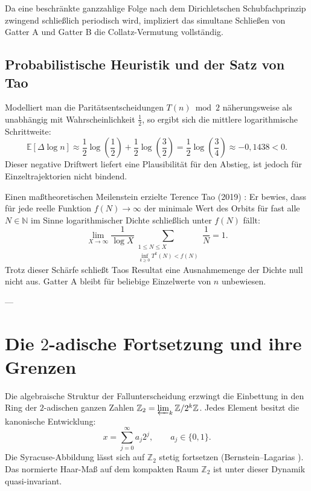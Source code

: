 \documentclass[11pt,reqno]{amsart}
\theoremstyle{definition}
\theoremstyle{remark}
\numberwithin{equation}{section}
\begin{document}
Da eine beschränkte ganzzahlige Folge nach dem Dirichletschen Schubfachprinzip zwingend schließlich periodisch wird, impliziert das simultane Schließen von Gatter A und Gatter B die Collatz-Vermutung vollständig.

\subsection{Probabilistische Heuristik und der Satz von Tao}

Modelliert man die Paritätsentscheidungen $T(n) \bmod 2$ näherungsweise als unabhängig mit Wahrscheinlichkeit $\frac{1}{2}$, so ergibt sich die mittlere logarithmische Schrittweite:
\begin{equation}
\mathbb{E}[\Delta \log n] \approx \frac{1}{2} \log\left(\frac{1}{2}\right) + \frac{1}{2} \log\left(\frac{3}{2}\right) = \frac{1}{2} \log\left(\frac{3}{4}\right) \approx -0{,}1438 < 0.
\end{equation}
Dieser negative Driftwert liefert eine Plausibilität für den Abstieg, ist jedoch für Einzeltrajektorien nicht bindend.

Einen maßtheoretischen Meilenstein erzielte Terence Tao (2019) \cite{Tao2019}: Er bewies, dass für jede reelle Funktion $f(N) \to \infty$ der minimale Wert des Orbits für fast alle $N \in \mathbb{N}$ im Sinne logarithmischer Dichte schließlich unter $f(N)$ fällt:
\begin{equation}
\lim_{X \to \infty} \frac{1}{\log X} \sum_{\substack{1 \le N \le X \\ \inf_{k \ge 0} T^k(N) < f(N)}} \frac{1}{N} = 1.
\end{equation}
Trotz dieser Schärfe schließt Taos Resultat eine Ausnahmemenge der Dichte null nicht aus. Gatter A bleibt für beliebige Einzelwerte von $n$ unbewiesen.

---

\section{Die $2$-adische Fortsetzung und ihre Grenzen}

Die algebraische Struktur der Fallunterscheidung erzwingt die Einbettung in den Ring der $2$-adischen ganzen Zahlen $\mathbb{Z}_2 = \varprojlim_k \mathbb{Z}/2^k\mathbb{Z}$. Jedes Element besitzt die kanonische Entwicklung:
\begin{equation}
x = \sum_{j=0}^\infty a_j 2^j, \qquad a_j \in \{0, 1\}.
\end{equation}
Die Syracuse-Abbildung lässt sich auf $\mathbb{Z}_2$ stetig fortsetzen (Bernstein--Lagarias \cite{Lagarias1985}). Das normierte Haar-Maß auf dem kompakten Raum $\mathbb{Z}_2$ ist unter dieser Dynamik quasi-invariant.
\end{document}
